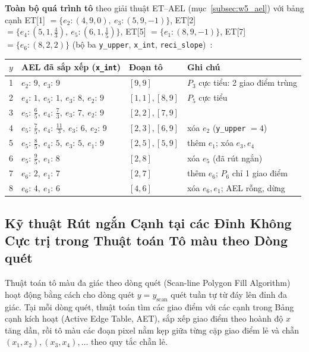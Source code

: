 \textbf{Toàn bộ quá trình tô} theo giải thuật ET--AEL (mục~\ref{subsec:w5_ael}) với bảng cạnh ET[1] $= \{e_2: (4, 9, 0),\ e_3: (5, 9, -1)\}$, ET[2] $= \{e_4: (5, 1, \tfrac43),\ e_5: (6, 1, \tfrac15)\}$, ET[5] $= \{e_1: (8, 9, -1)\}$, ET[7] $= \{e_6: (8, 2, 2)\}$ (bộ ba \texttt{y\_upper}, \texttt{x\_int}, \texttt{reci\_slope})~\citep{dhmt_lec7}:
\begin{center}
\small
\renewcommand{\arraystretch}{1.2}
\begin{tabular}{|c|l|l|l|}
\hline
$y$ & \textbf{AEL đã sắp xếp (\texttt{x\_int})} & \textbf{Đoạn tô} & \textbf{Ghi chú} \\ \hline
1 & $e_2{:}\,9,\ e_3{:}\,9$ & $[9, 9]$ & $P_3$ cực tiểu: 2 giao điểm trùng \\
2 & $e_4{:}\,1,\ e_5{:}\,1,\ e_3{:}\,8,\ e_2{:}\,9$ & $[1, 1], [8, 9]$ & $P_5$ cực tiểu \\
3 & $e_5{:}\,\tfrac65,\ e_4{:}\,\tfrac73,\ e_3{:}\,7,\ e_2{:}\,9$ & $[2, 2], [7, 9]$ & \\
4 & $e_5{:}\,\tfrac75,\ e_4{:}\,\tfrac{11}{3},\ e_3{:}\,6,\ e_2{:}\,9$ & $[2, 3], [6, 9]$ & xóa $e_2$ (\texttt{y\_upper} $= 4$) \\
5 & $e_5{:}\,\tfrac85,\ e_4{:}\,5,\ e_3{:}\,5,\ e_1{:}\,9$ & $[2, 5], [5, 9]$ & thêm $e_1$; xóa $e_3, e_4$ \\
6 & $e_5{:}\,\tfrac95,\ e_1{:}\,8$ & $[2, 8]$ & xóa $e_5$ (đã rút ngắn) \\
7 & $e_6{:}\,2,\ e_1{:}\,7$ & $[2, 7]$ & thêm $e_6$; $P_6$ chỉ 1 giao điểm \\
8 & $e_6{:}\,4,\ e_1{:}\,6$ & $[4, 6]$ & xóa $e_6, e_1$; AEL rỗng, dừng \\ \hline
\end{tabular}
\end{center}

\subsection{Kỹ thuật Rút ngắn Cạnh tại các Đỉnh Không Cực trị trong Thuật toán Tô màu theo Dòng quét}
\label{subsec:w5_shorten}

Thuật toán tô màu đa giác theo dòng quét (Scan-line Polygon Fill Algorithm) hoạt động bằng cách cho dòng quét $y = y_{\text{scan}}$ quét tuần tự từ đáy lên đỉnh đa giác. Tại mỗi dòng quét, thuật toán tìm các giao điểm với các cạnh trong Bảng cạnh kích hoạt (Active Edge Table, AET), sắp xếp giao điểm theo hoành độ $x$ tăng dần, rồi tô màu các đoạn pixel nằm kẹp giữa từng cặp giao điểm lẻ và chẵn $(x_1, x_2), (x_3, x_4), \dots$ theo quy tắc chẵn lẻ.

